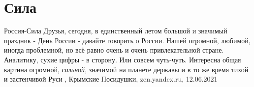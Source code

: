  
 
 
 
 
\chapter{Сила}

Россия-Сила
Друзья, сегодня, в единственный летом большой и значимый праздник - День России
- давайте говорить о России. Нашей огромной, любимой, иногда проблемной, но всё
равно очень и очень привлекательной стране.  Аналитику, сухие цифры - в
сторону. Или совсем чуть-чуть. Интересна общая картина огромной,
\emph{сильной}, значимой на планете державы и в то же время тихой и застенчивой
Руси
, 
Крымские Посидушки, zen.yandex.ru, 12.06.2021

